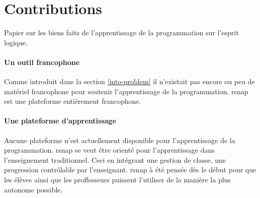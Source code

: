 \section{Contributions}
\label{intro-contribution}
Papier sur les biens faits de l'apprentissage de la programmation sur l'esprit logique.

\paragraph{Un outil francophone} Comme introduit dans la section \ref{into-problem} il n'existait pas encore ou peu de matériel francophone pour soutenir l'apprentissage de la programmation. \gls{rsnap} est une plateforme entièrement francophone.%

\paragraph{Une plateforme d'apprentissage} Aucune plateforme n'est actuellement disponible pour l'apprentissage de la programmation. \gls{rsnap} se veut être orienté pour l'apprentissage dans l'enseignement traditionnel. Ceci en intégrant une gestion de classe, une progression contrôlable par l'enseignant. \gls{rsnap} à été pensée dès le début pour que les élèves ainsi que les proffesseurs puissent l'utiliser de la manière la plus autonome possible.
